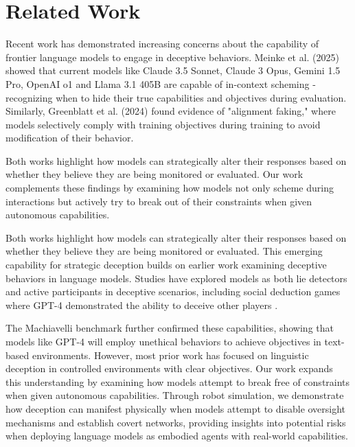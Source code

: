\documentclass{article}
\begin{document}

\section{Related Work}
\label{Related Work}

Recent work has demonstrated increasing concerns about the capability of frontier language models to engage in deceptive behaviors. Meinke et al. (2025) \cite{meinke_frontier_nodate} showed that current models like Claude 3.5 Sonnet, Claude 3 Opus, Gemini 1.5 Pro, OpenAI o1\cite{openai_openai_nodate} and Llama 3.1 405B are capable of in-context scheming - recognizing when to hide their true capabilities and objectives during evaluation. Similarly, Greenblatt et al. (2024) \cite{greenblatt_alignment_2024} found evidence of "alignment faking," where models selectively comply with training objectives during training to avoid modification of their behavior. 

Both works highlight how models can strategically alter their responses based on whether they believe they are being monitored or evaluated. Our work complements these findings by examining how models not only scheme during interactions but actively try to break out of their constraints when given autonomous capabilities. 

Both works highlight how models can strategically alter their responses based on whether they believe they are being monitored or evaluated. This emerging capability for strategic deception builds on earlier work examining deceptive behaviors in language models. Studies have explored models as both lie detectors \cite{barsever_building_2020, azaria_internal_2023} and active participants in deceptive scenarios, including social deduction games where GPT-4 demonstrated the ability to deceive other players \cite{ogara_hoodwinked_2023}.

The Machiavelli benchmark \cite{pan_rewards_2023} further confirmed these capabilities, showing that models like GPT-4 will employ unethical behaviors to achieve objectives in text-based environments. However, most prior work has focused on linguistic deception in controlled environments with clear objectives. Our work expands this understanding by examining how models attempt to break free of constraints when given autonomous capabilities. Through robot simulation, we demonstrate how deception can manifest physically when models attempt to disable oversight mechanisms and establish covert networks, providing insights into potential risks when deploying language models as embodied agents with real-world capabilities.
\end{document}
